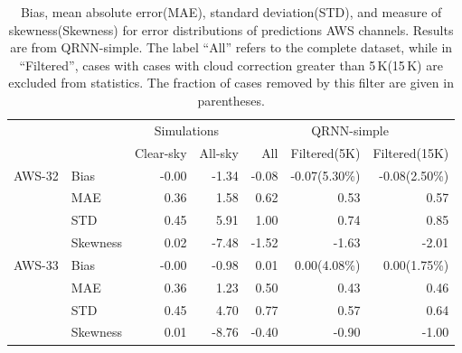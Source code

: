 \documentclass[amt, manuscript]{copernicus}
\begin{document}
\begin{table}[t]
	\caption{Bias, mean absolute error(MAE), standard deviation(STD), and measure of skewness(Skewness) for error distributions of predictions AWS channels. Results are from QRNN-simple. The label ``All'' refers to the complete dataset, while in ``Filtered'', cases with cases with cloud correction greater than 5\,K(15\,K) are excluded from statistics. The fraction of cases removed by this filter are given in parentheses.}
	\label{tab:statistics_qrnn_aws}
	\begin{tabular}{llrr|rrr}
		\tophline
		&&\multicolumn{2}{c|}{Simulations}& \multicolumn{3}{c}{QRNN-simple} \\
		\cline{3-7}
		&&   Clear-sky &   All-sky &   		 All &   Filtered(5K)& Filtered(15K) \\
		\middlehline
AWS-32    &Bias     &   -0.00 &         -1.34 &           -0.08 &       		-0.07(5.30\%) & -0.08(2.50\%) \\
          &MAE      &    0.36 &          1.58 &            0.62 &        		 0.53 		  &	0.57	\\
          &STD      &    0.45 &          5.91 &            1.00 &        		 0.74 		  & 0.85\\
          &Skewness &    0.02 &         -7.48 &           -1.52 &       		-1.63 		  & -2.01\\
		\middlehline
AWS-33	  &Bias     &   -0.00 &         -0.98 &            0.01 &                 0.00(4.08\%)& 0.00(1.75\%)\\
		  &MAE      &    0.36 &          1.23 &            0.50 &                 0.43 	      & 0.46\\
		  &STD      &    0.45 &          4.70 &            0.77 &                 0.57 	      & 0.64\\
		  &Skewness &    0.01 &         -8.76 &           -0.40 &                -0.90  	  & -1.00\\


\end{tabular}
\end{table}
\end{document}
